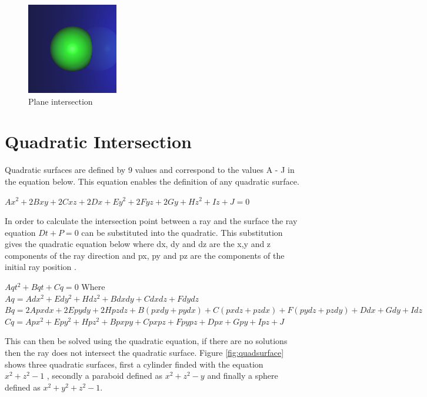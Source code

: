 \documentclass{article}
\begin{document}
\begin{figure}[H]
  \begin{center}
  \includegraphics[width=150px]{Images/plane.png}
  \caption{Plane intersection}
  \label{fig:plane}
  \end{center}
\end{figure}


\section{Quadratic Intersection}

Quadratic surfaces are defined by 9 values and correspond to the values A - J in the equation below.
This equation enables the definition of any quadratic surface.

\begin{center}
$Ax^2 + 2Bxy + 2Cxz + 2Dx + Ey^2 + 2Fyz + 2Gy + Hz^2 + Iz + J = 0$
\end{center}

In order to calculate the intersection point between a ray and the surface the
ray equation $Dt + P = 0$ can be substituted into the quadratic. This substitution gives the
quadratic equation below where dx, dy and dz are the x,y and z components of the ray
direction and px, py and pz are the components of the initial ray position \cite{quadratic}.

\begin{center}
$Aqt^2 + Bqt + Cq = 0$ Where
$Aq = Adx^2 + Edy^2 + Hdz^2 + Bdxdy + Cdxdz + Fdydz$
$Bq = 2Apxdx + 2Epydy + 2Hpzdz + B(pxdy + pydx) + C(pxdz + pzdx) + F(pydz + pzdy) + Ddx + Gdy + Idz$
$Cq = Apx^2 + Epy^2 + Hpz^2 + Bpxpy + Cpxpz + Fpypz + Dpx + Gpy + Ipz + J$
\end{center}

This can then be solved using the quadratic equation, if there are no solutions
then the ray does not intersect the quadratic surface. Figure \ref{fig:quadsurface}
shows three quadratic surfaces, first a cylinder finded with the equation $x^2 + z^2 - 1$
, secondly a paraboid defined as $x^2 + z^2 - y$ and finally a sphere defined as
$x^2 + y^2 + z^2 - 1$.
\end{document}
